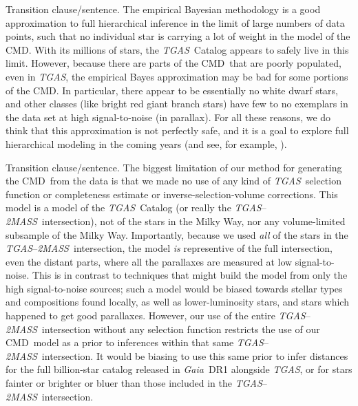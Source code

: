 \documentclass[modern]{aastex61}
\newcommand\BLcomment[1]{{\color{cyan}{[BL: #1]}}}
\newcommand{\acronym}[1]{{\small{#1}}}
\newcommand{\project}[1]{\textsl{#1}}
\newcommand{\tgas}{\project{\acronym{TGAS}}}
\newcommand{\tmass}{\project{\acronym{2MASS}}}
\newcommand{\gaia}{\project{Gaia}}
\newcommand{\cmd}{\acronym{CMD}}
\begin{document}
Transition clause/sentence. The empirical Bayesian methodology is a good approximation to full
hierarchical inference in the limit of large numbers of data points, such that no individual star is carrying a lot of weight in the
model of the \cmd.
With its millions of stars, the \tgas\ Catalog appears to safely
live in this limit.
However, because there are parts of the \cmd\ that are poorly populated,
even in \tgas, the empirical Bayes approximation may be bad for some
portions of the \cmd.
In particular, there appear to be essentially no white dwarf stars,
and other classes (like bright red giant branch stars) have few to no exemplars
in the data set at high signal-to-noise (in parallax).
For all these reasons, we do think that this approximation is not perfectly
safe, and it is a goal to explore full hierarchical modeling in the coming
years (and see, for example, \citealt{leistedtHogg2017}).

Transition clause/sentence. The biggest limitation of our method for generating the \cmd\ from the data is that we made no use of any kind of \tgas\ selection
function or completeness estimate or inverse-selection-volume corrections.
This model is a model of the \tgas\ Catalog
(or really the \tgas--\tmass\ intersection), not of the stars in
the Milky Way, nor any volume-limited subsample of the Milky Way.
Importantly, because we used \emph{all} of the stars in the \tgas--\tmass\
intersection, the model \emph{is} representive of the full intersection,
even the distant parts, where all the parallaxes are measured at low
signal-to-noise.
This is in contrast to techniques that might build the model from only
the high signal-to-noise sources; such a model would be biased towards
stellar types and compositions found locally, as well as lower-luminosity stars,
and stars which happened to get good parallaxes.
However, our use of the entire \tgas--\tmass\ intersection without
any selection function restricts the use of our \cmd\ model as a prior
to inferences within that same \tgas--\tmass\ intersection.
It would be biasing to use this same prior to infer
distances for the full billion-star catalog released in \gaia\ DR1
alongside \tgas, or for stars fainter or brighter or bluer than those
included in the \tgas--\tmass\ intersection.
\BLcomment{I would specifically mention again the assumption of stationarity, and explain how it is broken by the selection function (in particular fluctuations in the detection probability of objects as a function of position, parallax, photometry, etc). Here, or in the critical discussion of assumptions.}
\end{document}
